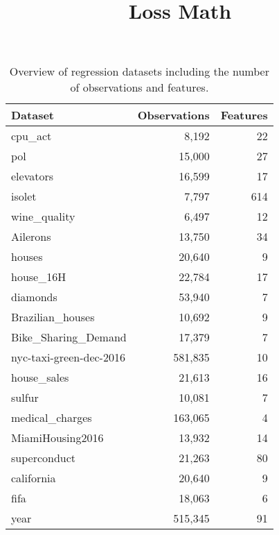 \documentclass{article}
\begin{document}
\title{Loss Math}
\author{}
\date{}

\maketitle

\begin{table}[ht]
    \centering
    \begin{tabular}{lrr}
    \hline
    \textbf{Dataset} & \textbf{Observations} & \textbf{Features} \\ \hline
    cpu\_act                & 8,192    & 22  \\
    pol                     & 15,000   & 27  \\
    elevators             & 16,599   & 17  \\
    isolet                  & 7,797    & 614 \\
    wine\_quality          & 6,497    & 12  \\
    Ailerons              & 13,750   & 34  \\
    houses                & 20,640   & 9   \\
    house\_16H            & 22,784   & 17  \\
    diamonds              & 53,940   & 7   \\
    Brazilian\_houses     & 10,692   & 9   \\
    Bike\_Sharing\_Demand  & 17,379   & 7   \\
    nyc-taxi-green-dec-2016& 581,835  & 10  \\
    house\_sales          & 21,613   & 16  \\
    sulfur                & 10,081   & 7   \\
    medical\_charges      & 163,065  & 4   \\
    MiamiHousing2016      & 13,932   & 14  \\
    superconduct          & 21,263   & 80  \\
    california            & 20,640   & 9   \\
    fifa                  & 18,063   & 6   \\
    year                  & 515,345  & 91  \\ \hline
    \end{tabular}
    \caption{Overview of regression datasets including the number of observations and features.}
    \label{tab:datasets}
    \end{table}
    
\end{document}
